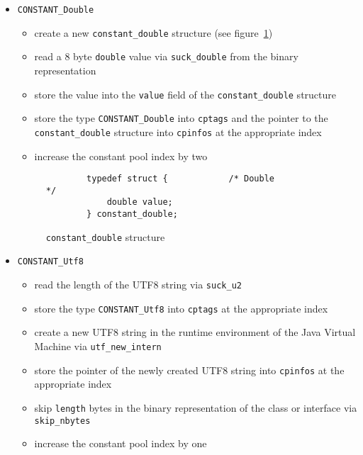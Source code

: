 \begin{itemize}
 \item \texttt{CONSTANT\_Double}

 \begin{itemize}

  \item create a new \texttt{constant\_double} structure (see
  figure~\ref{constantdoublestructure})

  \item read a 8 byte \texttt{double} value via \texttt{suck\_double}
  from the binary representation

  \item store the value into the \texttt{value} field of the
  \texttt{constant\_double} structure

  \item store the type \texttt{CONSTANT\_Double} into \texttt{cptags}
  and the pointer to the \texttt{constant\_double} structure into
  \texttt{cpinfos} at the appropriate index

  \item increase the constant pool index by two

 \end{itemize}

\begin{figure}[h]
\begin{verbatim}
        typedef struct {            /* Double                                     */
            double value;
        } constant_double;
\end{verbatim}
\caption{\texttt{constant\_double} structure}
\label{constantdoublestructure}
\end{figure}

 \item \texttt{CONSTANT\_Utf8}

 \begin{itemize}

  \item read the length of the UTF8 string via \texttt{suck\_u2}

  \item store the type \texttt{CONSTANT\_Utf8} into \texttt{cptags} at
  the appropriate index

  \item create a new UTF8 string in the runtime environment of the
  Java Virtual Machine via \texttt{utf\_new\_intern}

  \item store the pointer of the newly created UTF8 string into
  \texttt{cpinfos} at the appropriate index

  \item skip \texttt{length} bytes in the binary representation of the
  class or interface via \texttt{skip\_nbytes}

  \item increase the constant pool index by one

 \end{itemize}

\end{itemize}

